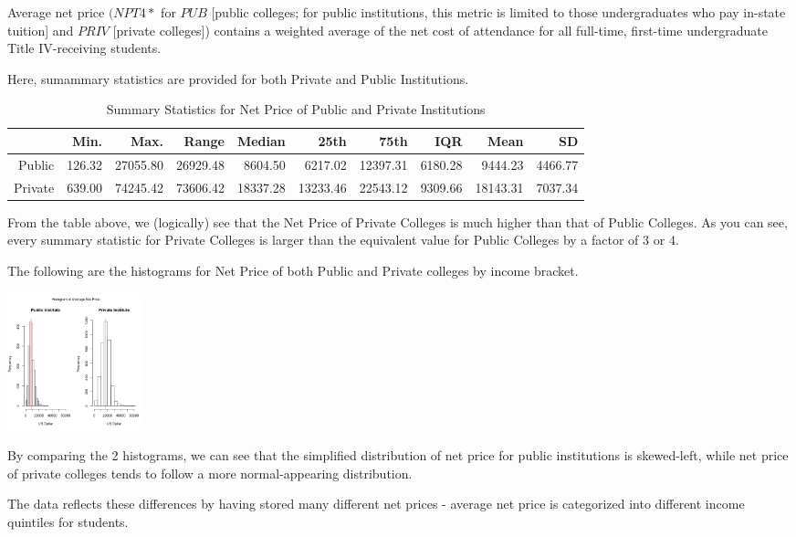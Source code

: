 \documentclass{article}\usepackage[]{graphicx}\usepackage[]{color}
\begin{document}
Average net price $(NPT4 *$ for $PUB$ [public colleges; for public institutions, this metric is limited to those undergraduates who pay in-state tuition] and $PRIV$ [private colleges]) contains a weighted average of the net cost of attendance for all full-time, first-time undergraduate Title IV-receiving students. 

Here, sumammary statistics are provided for both Private and Public Institutions.

\begin{table}[ht]
\centering
\begin{tabular}{rrrrrrrrrr}
  \hline
 & Min. & Max. & Range & Median & 25th & 75th & IQR & Mean & SD \\ 
  \hline
Public & 126.32 & 27055.80 & 26929.48 & 8604.50 & 6217.02 & 12397.31 & 6180.28 & 9444.23 & 4466.77 \\ 
  Private & 639.00 & 74245.42 & 73606.42 & 18337.28 & 13233.46 & 22543.12 & 9309.66 & 18143.31 & 7037.34 \\ 
   \hline
\end{tabular}
\caption{Summary Statistics for Net Price of Public and Private Institutions} 
\end{table}


From the table above, we (logically) see that the Net Price of Private Colleges is much higher than that of Public Colleges. As you can see, every summary statistic for Private Colleges is larger than the equivalent value for Public Colleges by a factor of 3 or 4.

The following are the histograms for Net Price of both Public and Private colleges by income bracket.



{\centering \includegraphics[width=150px]{../images/histogram-meanNetPrice} 

}




By comparing the 2 histograms, we can see that the simplified distribution of net price for public institutions is skewed-left, while net price of private colleges tends to follow a more normal-appearing distribution. 

The data reflects these differences by having stored many different net prices - average net price is categorized into different income quintiles for students. 
\end{document}
